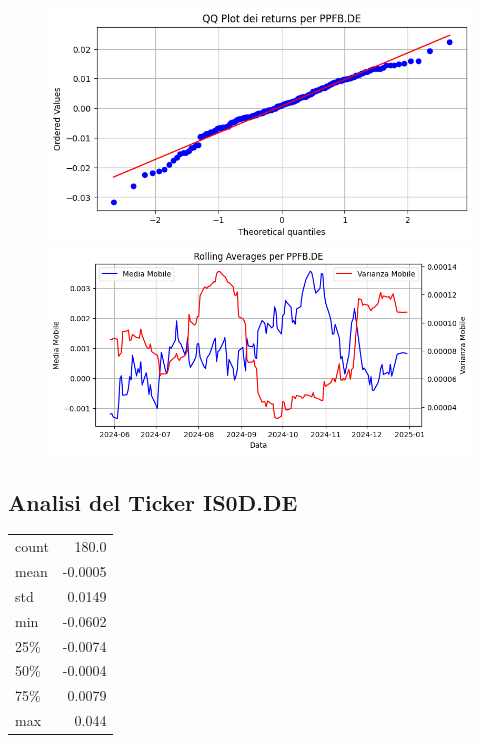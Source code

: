 \documentclass{article}%
\begin{document}
%


\begin{figure}[htbp]%
\begin{minipage}{0.48\textwidth}%
\includegraphics[width=\linewidth]{immagini_tickers/PPFB.DE_qq_plot.png}%
\end{minipage}%
\begin{minipage}{0.48\textwidth}%
\includegraphics[width=\linewidth]{immagini_tickers/PPFB.DE_rolling_averages.png}%
\end{minipage}%
\end{figure}

%
\subsection*{Analisi del Ticker IS0D.DE}%
\label{subsec:AnalisidelTickerIS0D.DE}%
\begin{tabular}{lr}%
count&180.0\\%
mean&{-}0.0005\\%
std&0.0149\\%
min&{-}0.0602\\%
25\%&{-}0.0074\\%
50\%&{-}0.0004\\%
75\%&0.0079\\%
max&0.044\\%
\end{tabular}%
\end{document}

